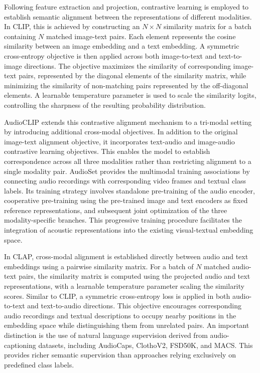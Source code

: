 \documentclass[pdflatex,sn-mathphys-num]{sn-jnl}%
\theoremstyle{thmstyleone}%
\theoremstyle{thmstyletwo}%
\theoremstyle{thmstylethree}%
\begin{document}
Following feature extraction and projection, contrastive learning is employed to establish semantic alignment between the representations of different modalities. In CLIP, this is achieved by constructing an $N \times N$ similarity matrix for a batch containing $N$ matched image-text pairs. Each element represents the cosine similarity between an image embedding and a text embedding. A symmetric cross-entropy objective is then applied across both image-to-text and text-to-image directions. The objective maximizes the similarity of corresponding image-text pairs, represented by the diagonal elements of the similarity matrix, while minimizing the similarity of non-matching pairs represented by the off-diagonal elements. A learnable temperature parameter is used to scale the similarity logits, controlling the sharpness of the resulting probability distribution.

AudioCLIP extends this contrastive alignment mechanism to a tri-modal setting by introducing additional cross-modal objectives. In addition to the original image-text alignment objective, it incorporates text-audio and image-audio contrastive learning objectives. This enables the model to establish correspondence across all three modalities rather than restricting alignment to a single modality pair. AudioSet provides the multimodal training associations by connecting audio recordings with corresponding video frames and textual class labels. Its training strategy involves standalone pre-training of the audio encoder, cooperative pre-training using the pre-trained image and text encoders as fixed reference representations, and subsequent joint optimization of the three modality-specific branches. This progressive training procedure facilitates the integration of acoustic representations into the existing visual-textual embedding space.

In CLAP, cross-modal alignment is established directly between audio and text embeddings using a pairwise similarity matrix. For a batch of $N$ matched audio-text pairs, the similarity matrix is computed using the projected audio and text representations, with a learnable temperature parameter scaling the similarity scores. Similar to CLIP, a symmetric cross-entropy loss is applied in both audio-to-text and text-to-audio directions. This objective encourages corresponding audio recordings and textual descriptions to occupy nearby positions in the embedding space while distinguishing them from unrelated pairs. An important distinction is the use of natural language supervision derived from audio-captioning datasets, including AudioCaps, ClothoV2, FSD50K, and MACS. This provides richer semantic supervision than approaches relying exclusively on predefined class labels.
\end{document}
